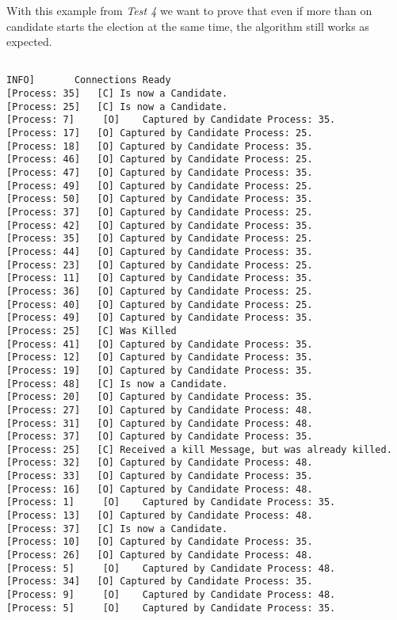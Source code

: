	With this example from \textit{Test 4} we want to prove that even if more than on candidate starts the election at the same time, the algorithm still works as expected.

	\vspace{10pt}
	
	\begin{Verbatim}[commandchars=\\\{\},codes={\catcode`$=3\catcode`_=8},frame=single,label=Test 6 output]
	
INFO]	  	Connections Ready
[Process: 35]	[C]	Is now a Candidate.
[Process: 25]	[C]	Is now a Candidate.
[Process: 7]	 [O]	Captured by Candidate Process: 35.
[Process: 17]	[O]	Captured by Candidate Process: 25.
[Process: 18]	[O]	Captured by Candidate Process: 35.
[Process: 46]	[O]	Captured by Candidate Process: 25.
[Process: 47]	[O]	Captured by Candidate Process: 35.
[Process: 49]	[O]	Captured by Candidate Process: 25.
[Process: 50]	[O]	Captured by Candidate Process: 35.
[Process: 37]	[O]	Captured by Candidate Process: 25.
[Process: 42]	[O]	Captured by Candidate Process: 35.
[Process: 35]	[O]	Captured by Candidate Process: 25.
[Process: 44]	[O]	Captured by Candidate Process: 35.
[Process: 23]	[O]	Captured by Candidate Process: 25.
[Process: 11]	[O]	Captured by Candidate Process: 35.
[Process: 36]	[O]	Captured by Candidate Process: 25.
[Process: 40]	[O]	Captured by Candidate Process: 25.
[Process: 49]	[O]	Captured by Candidate Process: 35.
[Process: 25]	[C]	Was Killed
[Process: 41]	[O]	Captured by Candidate Process: 35.
[Process: 12]	[O]	Captured by Candidate Process: 35.
[Process: 19]	[O]	Captured by Candidate Process: 35.
[Process: 48]	[C]	Is now a Candidate.
[Process: 20]	[O]	Captured by Candidate Process: 35.
[Process: 27]	[O]	Captured by Candidate Process: 48.
[Process: 31]	[O]	Captured by Candidate Process: 48.
[Process: 37]	[O]	Captured by Candidate Process: 35.
[Process: 25]	[C]	Received a kill Message, but was already killed.
[Process: 32]	[O]	Captured by Candidate Process: 48.
[Process: 33]	[O]	Captured by Candidate Process: 35.
[Process: 16]	[O]	Captured by Candidate Process: 48.
[Process: 1]	 [O]	Captured by Candidate Process: 35.
[Process: 13]	[O]	Captured by Candidate Process: 48.
[Process: 37]	[C]	Is now a Candidate.
[Process: 10]	[O]	Captured by Candidate Process: 35.
[Process: 26]	[O]	Captured by Candidate Process: 48.
[Process: 5]	 [O]	Captured by Candidate Process: 48.
[Process: 34]	[O]	Captured by Candidate Process: 35.
[Process: 9]	 [O]	Captured by Candidate Process: 48.
[Process: 5]	 [O]	Captured by Candidate Process: 35.

\end{Verbatim}
